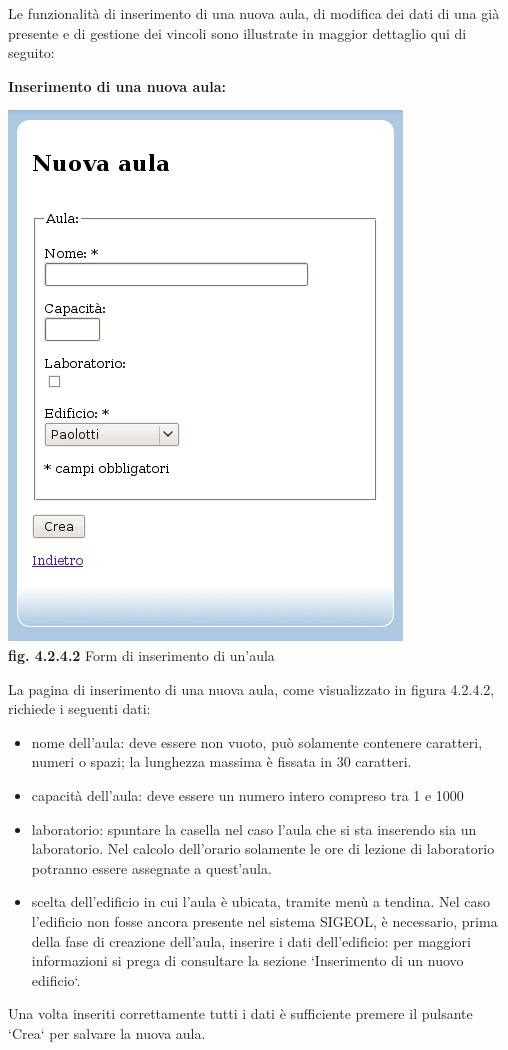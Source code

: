 \documentclass[11pt,a4paper]{article}
\begin{document}
Le funzionalità di inserimento di una nuova aula, di modifica dei dati di una già presente e di gestione dei vincoli sono illustrate in maggior dettaglio qui di seguito:
\newline \newline
\begin{large}\textbf{Inserimento di una nuova aula:}\end{large}

\bigskip
\begin{center}
	\includegraphics[scale=0.5]{images/nuova_aula.jpg}\\
	\textbf{fig. 4.2.4.2} Form di inserimento di un'aula\\
\end{center}
\bigskip

La pagina di inserimento di una nuova aula, come visualizzato in figura 4.2.4.2, richiede i seguenti dati:
\begin{itemize}
 \item nome dell'aula: deve essere non vuoto, può solamente contenere caratteri, numeri o spazi; la lunghezza massima è fissata in 30 caratteri. 
 \item capacità dell'aula: deve essere un numero intero compreso tra 1 e 1000
 \item laboratorio: spuntare la casella nel caso l'aula che si sta inserendo sia un laboratorio. Nel calcolo dell'orario solamente le ore di lezione di laboratorio potranno essere assegnate a quest'aula.
 \item scelta dell'edificio in cui l'aula è ubicata, tramite menù a tendina. Nel caso l'edificio non fosse ancora presente nel sistema SIGEOL, è necessario, prima della fase di creazione dell'aula, inserire i dati dell'edificio: per maggiori informazioni si prega di consultare la sezione `Inserimento di un nuovo edificio`.
\end{itemize}
Una volta inseriti correttamente tutti i dati è sufficiente premere il pulsante `Crea` per salvare la nuova aula.
\end{document}
